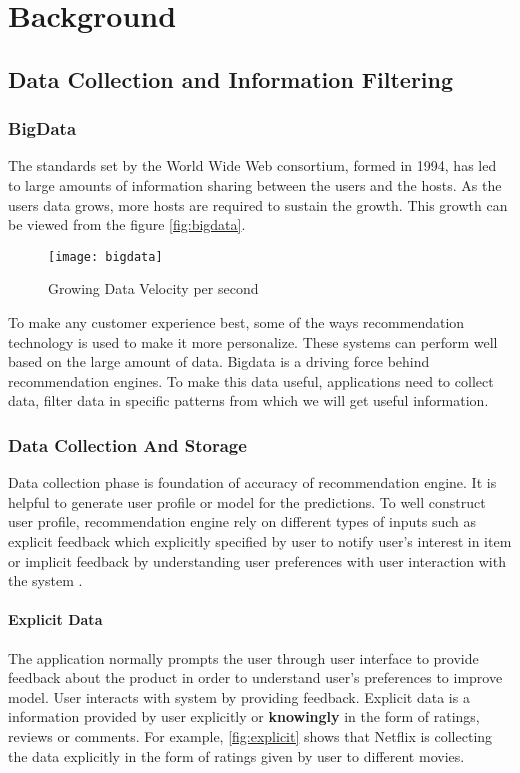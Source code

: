 \chapter{Background}
\section{Data Collection and Information Filtering}
\subsection{BigData}
The standards set by the World Wide Web consortium, formed in 1994, has led to large amounts of information sharing between the users and the hosts. As the users data grows, more hosts are required to sustain the growth. This growth can be viewed from the figure \autoref{fig:bigdata}.
\\
\begin{figure}[H]
	\centering
	\texttt{[image: bigdata]}
	\caption{Growing Data Velocity per second}
	\label{fig:bigdata}
\end{figure}

\noindent To make any customer experience best, some of the ways recommendation technology is used to make it more personalize. These systems can perform well based on the large amount of data. Bigdata is a driving force behind recommendation engines.
To make this data useful, applications need to collect data, filter data in specific patterns from which we will get useful information. 

\subsection{Data Collection And Storage}

Data collection phase is foundation of accuracy of recommendation engine. It is helpful to generate user profile or model for the predictions. To well construct user profile, recommendation engine rely on different types of inputs such as explicit feedback which explicitly specified by user to notify user's interest in item or implicit feedback by understanding user preferences with user interaction with the system \cite{34}. 

\subsubsection{Explicit Data}
The application normally prompts the user through user interface to provide feedback about the product in order to understand user's preferences to improve model. User interacts with system by providing feedback. Explicit data is a information provided by user explicitly or \textbf{knowingly} in the form of ratings, reviews or comments. For example, \autoref{fig:explicit} shows that Netflix is collecting the data explicitly in the form of ratings given by user to different movies. 
\\

